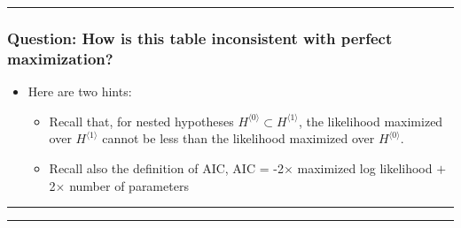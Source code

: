 \documentclass[]{article}
\begin{document}
\begin{center}\rule{0.5\linewidth}{\linethickness}\end{center}

\subsubsection{Question: How is this table inconsistent with perfect
maximization?}\label{question-how-is-this-table-inconsistent-with-perfect-maximization}

\begin{itemize}
\item
  Here are two hints:

  \begin{itemize}
  \item
    Recall that, for nested hypotheses
    \(H^{\langle 0\rangle}\subset H^{\langle 1\rangle}\), the likelihood
    maximized over \(H^{\langle 1\rangle}\) cannot be less than the
    likelihood maximized over \(H^{\langle 0\rangle}\).
  \item
    Recall also the definition of AIC, AIC = -2\(\times\) maximized log
    likelihood \(+\) 2\(\times\) number of parameters
  \end{itemize}
\end{itemize}

\begin{center}\rule{0.5\linewidth}{\linethickness}\end{center}

\begin{center}\rule{0.5\linewidth}{\linethickness}\end{center}
\end{document}

